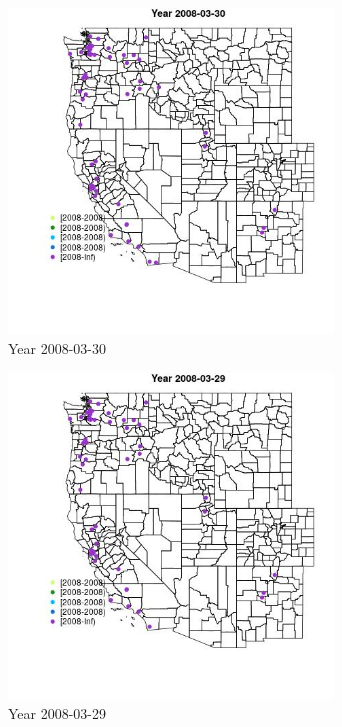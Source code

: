 \begin{figure} 
\centering  
\includegraphics[width=0.77\textwidth]{Code_Outputs/Report_ML_input_PM25_Step4_part_e_de_duplicated_aves_MapObsYear2008-03-30.jpg} 
\caption{\label{fig:Report_ML_input_PM25_Step4_part_e_de_duplicated_avesMapObsYear2008-03-30}Year 2008-03-30} 
\end{figure} 
 

\begin{figure} 
\centering  
\includegraphics[width=0.77\textwidth]{Code_Outputs/Report_ML_input_PM25_Step4_part_e_de_duplicated_aves_MapObsYear2008-03-29.jpg} 
\caption{\label{fig:Report_ML_input_PM25_Step4_part_e_de_duplicated_avesMapObsYear2008-03-29}Year 2008-03-29} 
\end{figure} 
 

